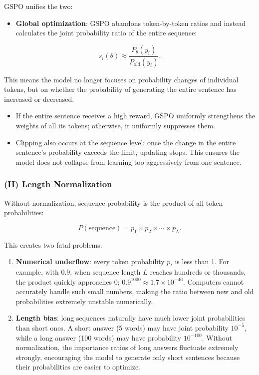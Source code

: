 GSPO unifies the two:

\begin{itemize}
\tightlist
\item
{}
  \textbf{Global optimization}: GSPO abandons token-by-token ratios and instead calculates the joint probability ratio of the entire sequence:
\end{itemize}

\[
s_i(\theta)
\approx
\frac{P_\theta(y_i)}
{P_{\mathrm{old}}(y_i)}.
\]

This means the model no longer focuses on probability changes of individual tokens, but on whether the probability of generating the entire sentence has increased or decreased.

\begin{itemize}
\tightlist
\item
  If the entire sentence receives a high reward, GSPO uniformly strengthens the weights of all its tokens; otherwise, it uniformly suppresses them.
\item
  Clipping also occurs at the sequence level: once the change in the entire sentence's probability exceeds the limit, updating stops. This ensures the model does not collapse from learning too aggressively from one sentence.
\end{itemize}

\hypertarget{ii-length-normalization}{%
\subsubsection{(II) Length Normalization}\label{ii-length-normalization}}

Without normalization, sequence probability is the product of all token probabilities:

\[
P(\mathrm{sequence})
=
p_1\times p_2\times\cdots\times p_L.
\]

This creates two fatal problems:

\begin{enumerate}
\def\labelenumi{\arabic{enumi}.}
\tightlist
\item
  \textbf{Numerical underflow}: every token probability \(p_t\) is less than 1. For example, with 0.9, when sequence length \(L\) reaches hundreds or thousands, the product quickly approaches 0; \(0.9^{1000}\approx 1.7\times 10^{-46}\). Computers cannot accurately handle such small numbers, making the ratio between new and old probabilities extremely unstable numerically.
\item
  \textbf{Length bias}: long sequences naturally have much lower joint probabilities than short ones. A short answer (5 words) may have joint probability \(10^{-5}\), while a long answer (100 words) may have probability \(10^{-100}\). Without normalization, the importance ratios of long answers fluctuate extremely strongly, encouraging the model to generate only short sentences because their probabilities are easier to optimize.
\end{enumerate}

